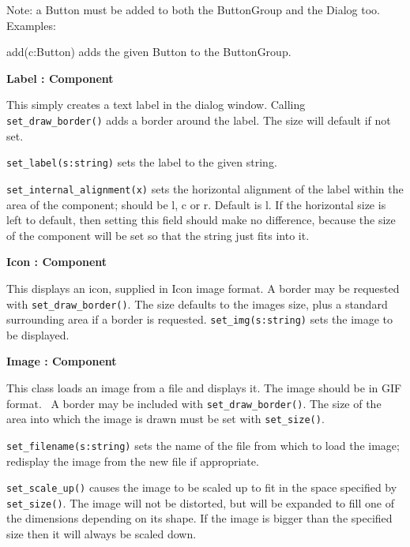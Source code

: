 Note: a Button must be added to both the ButtonGroup and the Dialog too.
Examples:


add(c:Button) adds the given Button to the ButtonGroup.

{\ttfamily\bfseries
{}Label : Component}

This simply creates a text label in the dialog window. Calling
\texttt{set\_draw\_border()} adds a border around the label. The size will
default if not set.

\texttt{set\_label(s:string)} sets the label to the given string.

\texttt{set\_internal\_alignment(x)} sets the horizontal alignment of the label
within the area of the component; should be
{\textquotedbl}l{\textquotedbl}, {\textquotedbl}c{\textquotedbl} or
{\textquotedbl}r{\textquotedbl}. Default is
{\textquotedbl}l{\textquotedbl}. If the horizontal size is left to
default, then setting this field should make no difference, because the
size of the component will be set so that the string just fits into it.

{\ttfamily\bfseries
{}Icon : Component}

This displays an icon, supplied in Icon image format. A border may be
requested with \texttt{set\_draw\_border()}. The size defaults to the
image{\textquotesingle}s size, plus a standard surrounding area if a
border is requested. \texttt{set\_img(s:string)} sets the image to be displayed.

{\ttfamily\bfseries
{}Image : Component}

This class loads an image from a file and displays it. The image should
be in GIF format. \ A border may be included with \texttt{set\_draw\_border()}.
The size of the area into which the image is drawn must be set with
\texttt{set\_size()}.

\texttt{set\_filename(s:string)} sets the name of the file from which to load
the image; redisplay the image from the new file if appropriate.

\texttt{set\_scale\_up()} causes the image to be scaled up to fit in the space
specified by \texttt{set\_size()}. The image will not be distorted, but will be
expanded to fill one of the dimensions depending on its shape. If the
image is bigger than the specified size then it will always be scaled
down.

